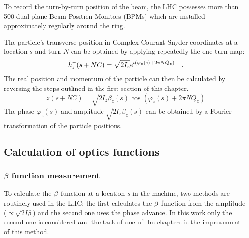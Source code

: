 To record the turn-by-turn position of the beam, the LHC possesses more than 500 dual-plane
Beam Position Monitors (BPMs) which are installed approximately regularly around the ring. 

The particle's transverse position in Complex Courant-Snyder coordinates at a location $s$ and turn
$N$ can be optained by applying repeatedly the one turn map:
%
\begin{equation}
    \hat{h}_z^\pm(s + NC) = \sqrt{2I_z} \text{e}^{i \left( \varphi_z(s) + 2\pi N Q_z\right)} 
    \quad .
\end{equation}
%
The real position and momentum of the particle can then be calculated by reversing the steps outlined
in the first section of this chapter.
%
\begin{equation}
    z(s + NC) = \sqrt{2I_z\beta_z(s)}\cos \left( \varphi_z(s) + 2\pi N Q_z\right)
\end{equation}
%
The phase $\varphi_z(s)$ and amplitude $\sqrt{2I_z\beta_z(s)}$ can be obtained by a Fourier transformation of
the particle positions.

\subsection{Calculation of optics functions}

\subsubsection{$\beta$ function measurement}
\label{sec_beta_meas}

To calculate the $\beta$~function at a location $s$ in the machine, two methods are routinely used
in the LHC: the first calculates the $\beta$~function from the amplitude ($\propto \sqrt{2I\beta}$)
and the second one uses the phase advance.
In this work only the second one is considered and the task of one of the chapters is the improvement
of this method.

